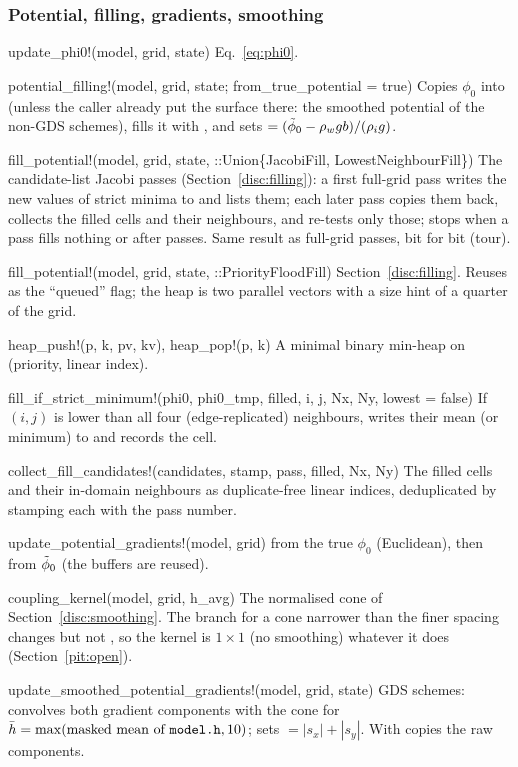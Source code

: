 \subsubsection*{Potential, filling, gradients, smoothing}
\begin{fnlist}
\item[update\_phi0!(model, grid, state)] Eq.~\eqref{eq:phi0}.
\item[potential\_filling!(model, grid, state; from\_true\_potential = true)] Copies $\phi_0$ into  (unless the caller
  already put the surface there: the smoothed potential of the non-GDS schemes), fills it with , and sets
   $= ({\tilde\phi_0} - {\rho_w} g b)/({\rho_i} g)$.
\item[fill\_potential!(model, grid, state, ::Union\{JacobiFill, LowestNeighbourFill\})] The candidate-list Jacobi passes
  (Section~\ref{disc:filling}): a first full-grid pass writes the new values of strict minima to  and lists them; each
  later pass copies them back, collects the filled cells and their neighbours, and re-tests only those; stops when a pass fills
  nothing or after  passes. Same result as full-grid passes, bit for bit (tour).
\item[fill\_potential!(model, grid, state, ::PriorityFloodFill)] Section~\ref{disc:filling}. Reuses  as the ``queued''
  flag; the heap is two parallel vectors with a size hint of a quarter of the grid.
\item[heap\_push!(p, k, pv, kv), heap\_pop!(p, k)] A minimal binary min-heap on (priority, linear index).
\item[fill\_if\_strict\_minimum!(phi0, phi0\_tmp, filled, i, j, Nx, Ny, lowest = false)] If $(i,j)$ is lower than all four (edge-replicated)
  neighbours, writes their mean (or minimum) to  and records the cell.
\item[collect\_fill\_candidates!(candidates, stamp, pass, filled, Nx, Ny)] The filled cells and their in-domain neighbours as
  duplicate-free linear indices, deduplicated by stamping each with the pass number.
\item[update\_potential\_gradients!(model, grid)]  from the true $\phi_0$ (Euclidean), then
   from ${\tilde\phi_0}$ (the buffers are reused).
\item[coupling\_kernel(model, grid, h\_avg)] The normalised cone of Section~\ref{disc:smoothing}. The branch for a cone narrower than
  the finer spacing changes  but not , so the kernel is $1\times1$ (no smoothing) whatever it does
  (Section~\ref{pit:open}).
\item[update\_smoothed\_potential\_gradients!(model, grid, state)] GDS schemes: convolves both gradient components with the cone for
  $\bar h = \max(\text{masked mean of } \texttt{model.h}, 10)$; sets  $= |s_x| + |s_y|$. With
   copies the raw components.
\end{fnlist}

